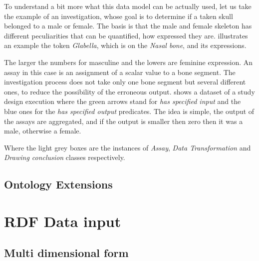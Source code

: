 

To understand a bit more what this data model can be actually used, let us take the example of an investigation, whose goal is to determine if a taken skull belonged to a male or female. The basis is that the male and female skeleton has different peculiarities that can be quantified, how expressed they are.  illustrates an example the token \textit{Glabella}, which is on the \textit{Nasal bone}, and its expressions.  



The larger the numbers for masculine and the lowers are feminine expression. An assay in this case is an assignment of a scalar value to a bone segment. The investigation process does not take only one bone segment but several different ones, to reduce the possibility of the erroneous output.  shows a dataset of a study design execution where the green arrows stand for \textit{has specified input} and the blue ones for the \textit{has specified output} predicates. The idea is simple, the output of the assays are aggregated, and if the output is smaller then zero then it was a male, otherwise a female.



Where the light grey boxes are the instances of \textit{Assay}, \textit{Data Transformation} and \textit{Drawing conclusion} classes respectively.


\subsection{Ontology Extensions} \label{333}







\section{RDF Data input}

\subsection{Multi dimensional form}


